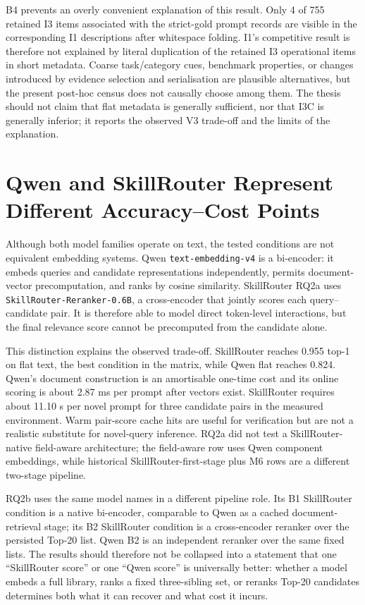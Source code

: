 B4 prevents an overly convenient explanation of this result. Only 4 of 755 retained I3 items associated with the strict-gold prompt records are visible in the corresponding I1 descriptions after whitespace folding. I1's competitive result is therefore not explained by literal duplication of the retained I3 operational items in short metadata. Coarse task/category cues, benchmark properties, or changes introduced by evidence selection and serialisation are plausible alternatives, but the present post-hoc census does not causally choose among them. The thesis should not claim that flat metadata is generally sufficient, nor that I3C is generally inferior; it reports the observed V3 trade-off and the limits of the explanation.

\section{Qwen and SkillRouter Represent Different Accuracy--Cost Points}

Although both model families operate on text, the tested conditions are not equivalent embedding systems. Qwen \texttt{text-embedding-v4} is a bi-encoder: it embeds queries and candidate representations independently, permits document-vector precomputation, and ranks by cosine similarity. SkillRouter RQ2a uses \texttt{SkillRouter-Reranker-0.6B}, a cross-encoder that jointly scores each query--candidate pair. It is therefore able to model direct token-level interactions, but the final relevance score cannot be precomputed from the candidate alone.

This distinction explains the observed trade-off. SkillRouter reaches 0.955 top-1 on flat text, the best condition in the matrix, while Qwen flat reaches 0.824. Qwen's document construction is an amortisable one-time cost and its online scoring is about 2.87 ms per prompt after vectors exist. SkillRouter requires about 11.10 s per novel prompt for three candidate pairs in the measured environment. Warm pair-score cache hits are useful for verification but are not a realistic substitute for novel-query inference. RQ2a did not test a SkillRouter-native field-aware architecture; the field-aware row uses Qwen component embeddings, while historical SkillRouter-first-stage plus M6 rows are a different two-stage pipeline.

RQ2b uses the same model names in a different pipeline role. Its B1 SkillRouter condition is a native bi-encoder, comparable to Qwen as a cached document-retrieval stage; its B2 SkillRouter condition is a cross-encoder reranker over the persisted Top-20 list. Qwen B2 is an independent reranker over the same fixed lists. The results should therefore not be collapsed into a statement that one ``SkillRouter score'' or one ``Qwen score'' is universally better: whether a model embeds a full library, ranks a fixed three-sibling set, or reranks Top-20 candidates determines both what it can recover and what cost it incurs.

